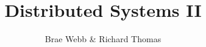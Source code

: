 \documentclass{csse4400}
\title{Distributed Systems II}
\author{Brae Webb \& Richard Thomas}
\date{\week{6}}
\begin{document}
\makecover





\end{document}

